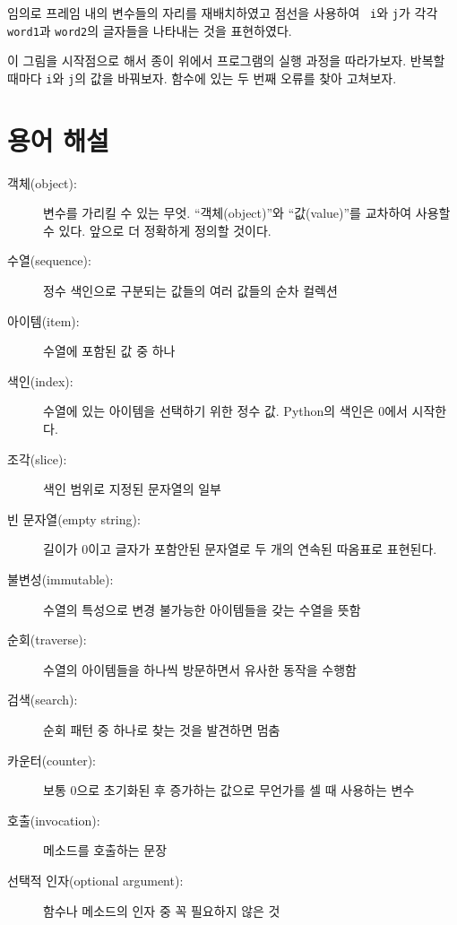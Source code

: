 \documentclass[10pt]{book}
\begin{document}
임의로 프레임 내의 변수들의 자리를 재배치하였고 점선을 사용하여 {\tt
  i}와 {\tt j}가 각각 {\tt word1}과 {\tt word2}의 글자들을 나타내는
것을 표현하였다.

이 그림을 시작점으로 해서 종이 위에서 프로그램의 실행 과정을
따라가보자.  반복할 때마다 {\tt i}와 {\tt j}의 값을 바꿔보자.  함수에
있는 두 번째 오류를 찾아 고쳐보자.
\label{isreverse}


\section{용어 해설}

\begin{description}

\item[객체(object):] 변수를 가리킬 수 있는 무엇. ``객체(object)''와
  ``값(value)''를 교차하여 사용할 수 있다.  앞으로 더 정확하게 정의할
  것이다.

\item[수열(sequence):] 정수 색인으로 구분되는 값들의 여러 값들의 순차 컬렉션

\item[아이템(item):] 수열에 포함된 값 중 하나

\item[색인(index):] 수열에 있는 아이템을 선택하기 위한 정수 값.
  Python의 색인은 0에서 시작한다.

\item[조각(slice):] 색인 범위로 지정된 문자열의 일부

\item[빈 문자열(empty string):] 길이가 0이고 글자가 포함안된 문자열로
  두 개의 연속된 따옴표로 표현된다.

\item[불변성(immutable):] 수열의 특성으로 변경 불가능한 아이템들을 갖는
  수열을 뜻함

\item[순회(traverse):] 수열의 아이템들을 하나씩 방문하면서 유사한 동작을 수행함

\item[검색(search):] 순회 패턴 중 하나로 찾는 것을 발견하면 멈춤

\item[카운터(counter):] 보통 0으로 초기화된 후 증가하는 값으로 무언가를
  셀 때 사용하는 변수

\item[호출(invocation):] 메소드를 호출하는 문장

\item[선택적 인자(optional argument):] 함수나 메소드의 인자 중 꼭 필요하지 않은 것

\end{description}
\end{document}
